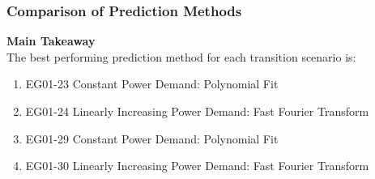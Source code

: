 \begin{frame}
  \frametitle{Comparison of Prediction Methods}
  \textbf{Main Takeaway}
  \\
  The best performing prediction method for each transition scenario is: 
  \begin{enumerate}
    \item EG01-23 Constant Power Demand: Polynomial Fit 
    \item EG01-24 Linearly Increasing Power Demand: Fast Fourier Transform
    \item EG01-29 Constant Power Demand: Polynomial Fit 
    \item EG01-30 Linearly Increasing Power Demand: Fast Fourier Transform
\end{enumerate}
\end{frame}